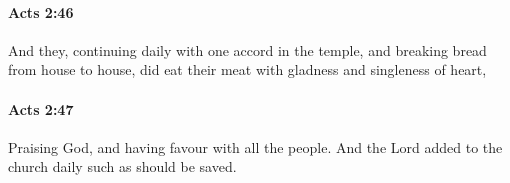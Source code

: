 		\paragraph{Acts 2:46} %
			\label{ACTS-2-46}

			And they, continuing daily with one accord in the temple, and breaking bread from house to house, did eat their meat with gladness and singleness of heart,

			\begin{framed}
			\scriptsize
				\begin{compactdesc}
					\item[SBLG] 
				\end{compactdesc}
			\end{framed}

		\paragraph{Acts 2:47} %
			\label{ACTS-2-47}

			Praising God, and having favour with all the people.  And the Lord added to the church daily such as should be saved.

